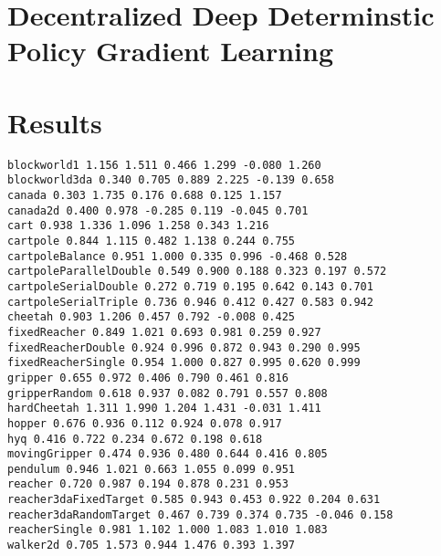 \documentclass{article} %
\numberwithin{equation}{subsection}
\numberwithin{theorem}{subsection}
\begin{document}

\section{Decentralized Deep Determinstic Policy Gradient Learning}





\section{Results}
\begin{verbatim}
blockworld1 1.156 1.511 0.466 1.299 -0.080 1.260
blockworld3da 0.340 0.705 0.889 2.225 -0.139 0.658
canada 0.303 1.735 0.176 0.688 0.125 1.157
canada2d 0.400 0.978 -0.285 0.119 -0.045 0.701
cart 0.938 1.336 1.096 1.258 0.343 1.216
cartpole 0.844 1.115 0.482 1.138 0.244 0.755
cartpoleBalance 0.951 1.000 0.335 0.996 -0.468 0.528
cartpoleParallelDouble 0.549 0.900 0.188 0.323 0.197 0.572
cartpoleSerialDouble 0.272 0.719 0.195 0.642 0.143 0.701
cartpoleSerialTriple 0.736 0.946 0.412 0.427 0.583 0.942
cheetah 0.903 1.206 0.457 0.792 -0.008 0.425
fixedReacher 0.849 1.021 0.693 0.981 0.259 0.927
fixedReacherDouble 0.924 0.996 0.872 0.943 0.290 0.995
fixedReacherSingle 0.954 1.000 0.827 0.995 0.620 0.999
gripper 0.655 0.972 0.406 0.790 0.461 0.816
gripperRandom 0.618 0.937 0.082 0.791 0.557 0.808
hardCheetah 1.311 1.990 1.204 1.431 -0.031 1.411
hopper 0.676 0.936 0.112 0.924 0.078 0.917
hyq 0.416 0.722 0.234 0.672 0.198 0.618
movingGripper 0.474 0.936 0.480 0.644 0.416 0.805
pendulum 0.946 1.021 0.663 1.055 0.099 0.951
reacher 0.720 0.987 0.194 0.878 0.231 0.953
reacher3daFixedTarget 0.585 0.943 0.453 0.922 0.204 0.631
reacher3daRandomTarget 0.467 0.739 0.374 0.735 -0.046 0.158
reacherSingle 0.981 1.102 1.000 1.083 1.010 1.083
walker2d 0.705 1.573 0.944 1.476 0.393 1.397
\end{verbatim}
\end{document}
